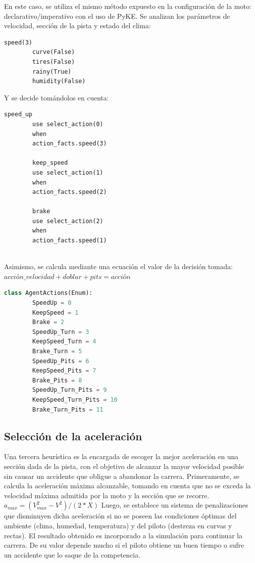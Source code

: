 \documentclass[12pt, letterpaper,spanish]{article}
\theoremstyle{definition}
\theoremstyle{remark}
\begin{document}
	En este caso, se utiliza el mismo método expuesto en la configuración de la moto: declarativo/imperativo con el uso de PyKE.
	Se analizan los parámetros de velocidad, sección de la pista y estado del clima:
	\begin{lstlisting}[language={PySharp}, label={Script}]
		speed(3)
		curve(False)
		tires(False)
		rainy(True)
		humidity(False)
	\end{lstlisting}
	
	Y se decide tomándolos en cuenta:
	\begin{lstlisting}[language={PySharp}, label={Script}]
		speed_up
		use select_action(0)
		when
		action_facts.speed(3)
		
		keep_speed
		use select_action(1)
		when
		action_facts.speed(2)
		
		brake
		use select_action(2)
		when
		action_facts.speed(1)
		
	\end{lstlisting}
	
	Asimismo, se calcula mediante una ecuación el valor de la decisión tomada:
	$acción\_velocidad + doblar + pits = acción$
	
	\begin{lstlisting}[language={Python}, label={Script}]
		class AgentActions(Enum):
		SpeedUp = 0
		KeepSpeed = 1
		Brake = 2
		SpeedUp_Turn = 3
		KeepSpeed_Turn = 4
		Brake_Turn = 5
		SpeedUp_Pits = 6
		KeepSpeed_Pits = 7
		Brake_Pits = 8
		SpeedUp_Turn_Pits = 9
		KeepSpeed_Turn_Pits = 10
		Brake_Turn_Pits = 11
	\end{lstlisting}
	
	\subsection{Selección de la aceleración}
	Una tercera heurística es la encargada de escoger la mejor aceleración en una sección dada de la pista, con el objetivo de alcanzar la mayor velocidad posible sin causar un accidente que obligue a abandonar la carrera. 
	Primeramente, se calcula la aceleración máxima alcanzable, tomando en cuenta que no se exceda la velocidad máxima admitida por la moto y la sección que se recorre.
	$a_{max}=(V_{max}^{2}-V^{2})/(2*X)$
	Luego, se establece un sistema de penalizaciones que disminuyen dicha aceleración si no se poseen las condiciones óptimas del ambiente (clima, humedad, temperatura) y del piloto (destreza en curvas y rectas).
	El resultado obtenido es incorporado a la simulación para continuar la carrera. De su valor depende mucho si el piloto obtiene un buen tiempo o sufre un accidente que lo saque de la competencia.
	
\pagebreak


\end{document}
